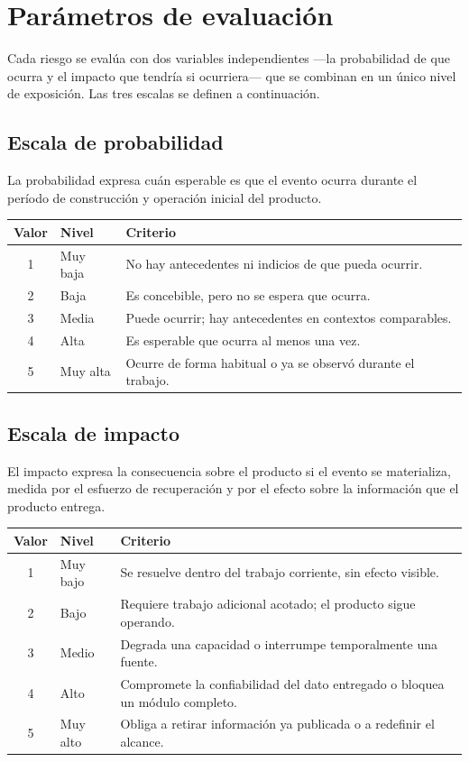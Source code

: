 \documentclass[11pt,a4paper]{article}
\begin{document}
\section{Par\'ametros de evaluaci\'on}

Cada riesgo se eval\'ua con dos variables independientes ---la probabilidad de
que ocurra y el impacto que tendr\'ia si ocurriera--- que se combinan en un
\'unico nivel de exposici\'on. Las tres escalas se definen a continuaci\'on.

\subsection{Escala de probabilidad}

La probabilidad expresa cu\'an esperable es que el evento ocurra durante el
per\'iodo de construcci\'on y operaci\'on inicial del producto.

\begin{tabularx}{\textwidth}{@{}c l X@{}}
\toprule
\textbf{Valor} & \textbf{Nivel} & \textbf{Criterio} \\
\midrule
1 & Muy baja & No hay antecedentes ni indicios de que pueda ocurrir. \\
2 & Baja     & Es concebible, pero no se espera que ocurra. \\
3 & Media    & Puede ocurrir; hay antecedentes en contextos comparables. \\
4 & Alta     & Es esperable que ocurra al menos una vez. \\
5 & Muy alta & Ocurre de forma habitual o ya se observ\'o durante el trabajo. \\
\bottomrule
\end{tabularx}

\subsection{Escala de impacto}

El impacto expresa la consecuencia sobre el producto si el evento se
materializa, medida por el esfuerzo de recuperaci\'on y por el efecto sobre la
informaci\'on que el producto entrega.

\begin{tabularx}{\textwidth}{@{}c l X@{}}
\toprule
\textbf{Valor} & \textbf{Nivel} & \textbf{Criterio} \\
\midrule
1 & Muy bajo & Se resuelve dentro del trabajo corriente, sin efecto visible. \\
2 & Bajo     & Requiere trabajo adicional acotado; el producto sigue operando. \\
3 & Medio    & Degrada una capacidad o interrumpe temporalmente una fuente. \\
4 & Alto     & Compromete la confiabilidad del dato entregado o bloquea un m\'odulo completo. \\
5 & Muy alto & Obliga a retirar informaci\'on ya publicada o a redefinir el alcance. \\
\bottomrule
\end{tabularx}
\end{document}
